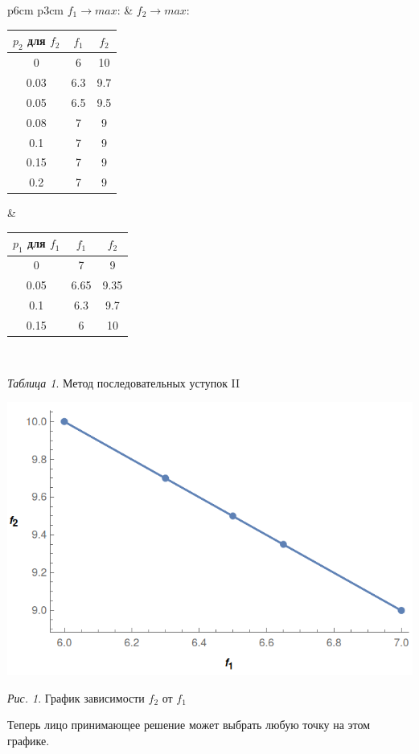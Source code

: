 \documentclass[14pt,fleqn]{extarticle}
\begin{document}
	\begin{center}
		\begin{tabular}{p{6cm} p{3cm}}
			$f_1 \longrightarrow max$: & $f_2 \longrightarrow max$:\\
			\begin{tabular}{ |c|c|c| }
				\hline
				$p_2$ для $f_2$ & $f_1$ & $f_2$\\
				\hline
				0 & 6 & 10\\
				\hline
				0.03 & 6.3 & 9.7\\
				\hline
				0.05 & 6.5 & 9.5\\
				\hline
				0.08 & 7 & 9\\
				\hline
				0.1 & 7 & 9\\
				\hline
				0.15 & 7 & 9 \\
				\hline
				0.2 & 7 & 9\\
				\hline
			\end{tabular} &
			\begin{tabular}{ |c|c|c| }
				\hline
				$p_1$ для $f_1$ & $f_1$ & $f_2$\\
				\hline
				0 & 7 & 9\\
				\hline
				0.05 & 6.65 & 9.35 \\
				\hline
				0.1 & 6.3 & 9.7 \\
				\hline
				0.15 & 6 & 10 \\
				\hline
			\end{tabular} \\
		\end{tabular}
	\end{center}
	\begin{center}
		\textit{Таблица 1}. Метод последовательных уступок II
	\end{center}
	\begin{center}
		\includegraphics[scale=0.45]{plot}
	\end{center}
	\begin{center}
		\textit{Рис. 1}. График зависимости $f_2$ от $f_1$
	\end{center}
	Теперь лицо принимающее решение может выбрать любую точку на этом графике.
	\newpage
	
\end{document}
